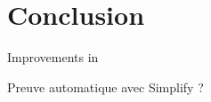 \section{Conclusion}
\label{sec:conclusion}

Improvements in \caduceus{} 

Preuve automatique avec Simplify ?


